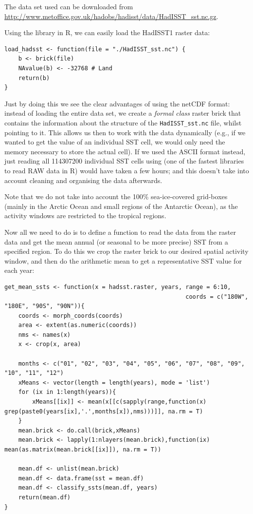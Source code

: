 The data set used can be downloaded from \url{http://www.metoffice.gov.uk/hadobs/hadisst/data/HadISST_sst.nc.gz}.

\sk
Using the  library in R, we can easily load the HadISST1 raster data:
\begin{lstlisting}[caption=Function to load HasISST data set in netCDF format, label=snp:hadisst-read]
load_hadsst <- function(file = "./HadISST_sst.nc") {
	b <- brick(file)
	NAvalue(b) <- -32768 # Land
	return(b)
}
\end{lstlisting}
Just by doing this we see the clear advantages of using the netCDF format: instead of loading the entire data set, we create a \emph{formal class} raster brick that contains the information about the structure of the \texttt{HadISST\_sst.nc} file, whilst pointing to it. This allows us then to work with the data dynamically (e.g., if we wanted to get the value of an individual SST cell, we would only need the memory necessary to store the actual cell). If we used the ASCII format instead, just reading all \num{114307200} individual SST cells using  (one of the fastest libraries to read RAW data in R) would have taken a few hours; and this doesn't take into account cleaning and organising the data afterwards.

Note that we do not take into account the 100\% sea-ice-covered grid-boxes (mainly in the Arctic Ocean and small regions of the Antarctic Ocean), as the activity windows are restricted to the tropical regions.

\sk
Now all we need to do is to define a function to read the data from the raster data and get the mean annual (or seasonal to be more precise) SST from a specified region. To do this we crop the raster brick to our desired spatial activity window, and then do the arithmetic mean to get a representative SST value for each year:
\begin{lstlisting}[caption=Function to get mean SSTs data frame from a specific spatial and temporal activity window, label=snp:hadisst-mean-ssts]
get_mean_ssts <- function(x = hadsst.raster, years, range = 6:10,
													coords = c("180W", "180E", "90S", "90N")){
	coords <- morph_coords(coords)
	area <- extent(as.numeric(coords))
	nms <- names(x)
	x <- crop(x, area)

	months <- c("01", "02", "03", "04", "05", "06", "07", "08", "09", "10", "11", "12")
	xMeans <- vector(length = length(years), mode = 'list')
	for (ix in 1:length(years)){
		xMeans[[ix]] <- mean(x[[c(sapply(range,function(x) grep(paste0(years[ix],'.',months[x]),nms)))]], na.rm = T)
	}
	mean.brick <- do.call(brick,xMeans)
	mean.brick <- lapply(1:nlayers(mean.brick),function(ix) mean(as.matrix(mean.brick[[ix]]), na.rm = T))

	mean.df <- unlist(mean.brick)
	mean.df <- data.frame(sst = mean.df)
	mean.df <- classify_ssts(mean.df, years)
	return(mean.df)
}
\end{lstlisting}

